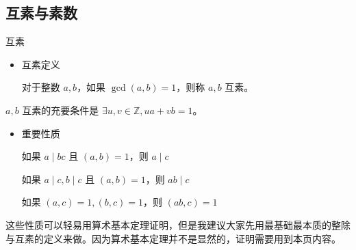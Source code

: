 \documentclass [hyperref={bookmarksdepth=4}, aspectratio=169] {beamer}
\theoremstyle {fy}
\def\Z{\mathbb{Z}}
\begin{document}
\subsection{互素与素数}

\begin{frame}{互素}
\begin{itemize}
    \item 互素定义

  对于整数 $a,b$，如果 $\gcd(a,b)=1$，则称 $a,b$ 互素。
\end{itemize}

$a,b$ 互素的充要条件是 $\exists u,v\in \Z,ua+vb=1$。

\begin{itemize}
    \item 重要性质

  如果 $a\mid bc$ 且 $(a,b)=1$，则 $a\mid c$

  如果 $a\mid c,b\mid c$ 且 $(a,b)=1$，则 $ab\mid c$

  如果 $(a,c)=1,(b,c)=1$，则 $(ab,c)=1$
\end{itemize}

这些性质可以轻易用算术基本定理证明，但是我建议大家先用最基础最本质的整除与互素的定义来做。因为算术基本定理并不是显然的，证明需要用到本页内容。
\end{frame}
\end{document}
